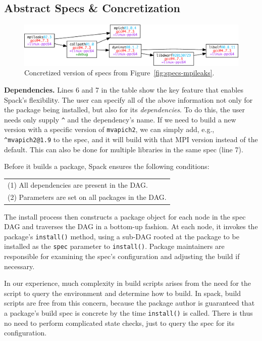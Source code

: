
\subsection{Abstract Specs \& Concretization}
	

\begin{figure}
	\centering
	\includegraphics[width=\columnwidth]{specs/mpileaks-concrete.pdf}
	\caption{
		Concretized version of specs from Figure~\ref{fig:specs-mpileaks}.
		\label{fig:specs-mpileaks-concrete}
	}
\end{figure}



{\bf Dependencies.}
Lines 6 and 7 in the table show the key feature that enables Spack's flexibility.
The user can specify all of the above information not only for the package being
installed, but also for its {\it dependencies}.  To do this, the user needs only supply 
\verb|^| and the dependency's name.  If we need to build a new version with a specific
version of {\tt mvapich2}, we can simply add, e.g., \verb|^mvapich2@1.9|
to the spec, and it will build with that MPI version instead of the default.
This can also be done for multiple libraries in the same spec (line 7).  




Before it builds a package, Spack ensures the following conditions:
\newline

\begin{tabular}{l}
(1) All dependencies are present in the DAG. \\
(2) Parameters are set on all packages in the DAG. \\
\end{tabular}\newline

\noindent
The install process then constructs a package object for each node in the spec DAG
and traverses the DAG in a bottom-up fashion.  At each node, it invokes the package's
{\tt install()} method, using a sub-DAG rooted at the package to be installed as the {\tt spec}
parameter to {\tt install()}. Package maintainers are responsible for examining the spec's
configuration and adjusting the build if necessary.


In our experience, much complexity in build scripts arises from the need for the script to
query the environment and determine how to build.  In spack, build scripts are free from this 
concern, because the package author is guaranteed that a package's build spec is concrete
by the time {\tt install()} is called. There is thus no need to perform complicated state checks,
just to query the spec for its configuration.


